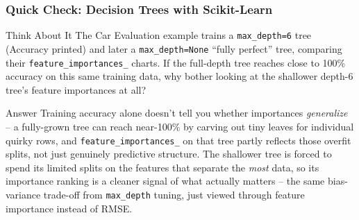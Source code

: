 \begin{frame}[fragile]\frametitle{Quick Check: Decision Trees with Scikit-Learn}
\begin{block}{Think About It}
The Car Evaluation example trains a \texttt{max\_depth=6} tree (Accuracy printed) and later a \texttt{max\_depth=None} ``fully perfect'' tree, comparing their \texttt{feature\_importances\_} charts. If the full-depth tree reaches close to 100\% accuracy on this same training data, why bother looking at the shallower depth-6 tree's feature importances at all?
\end{block}
\pause
\begin{block}{Answer}
Training accuracy alone doesn't tell you whether importances \emph{generalize} -- a fully-grown tree can reach near-100\% by carving out tiny leaves for individual quirky rows, and \texttt{feature\_importances\_} on that tree partly reflects those overfit splits, not just genuinely predictive structure. The shallower tree is forced to spend its limited splits on the features that separate the \emph{most} data, so its importance ranking is a cleaner signal of what actually matters -- the same bias-variance trade-off from \texttt{max\_depth} tuning, just viewed through feature importance instead of RMSE.
\end{block}
\end{frame}

